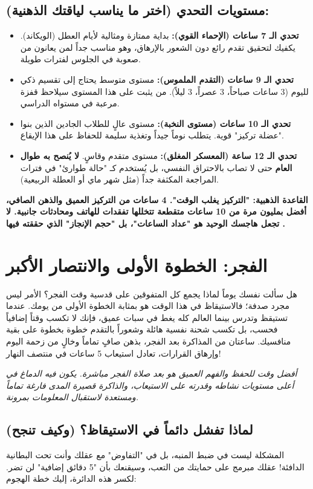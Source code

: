 \documentclass[12pt,a4paper]{book}
\newcommand{\quoteAr}[1]{%
	\begin{myquote}
		\itshape #1
	\end{myquote}
}
\newcommand{\importantAr}[1]{%
	\begin{important}
		\bfseries #1
	\end{important}
}
\begin{document}
	\subsection*{مستويات التحدي (اختر ما يناسب لياقتك الذهنية):}
	\begin{itemize}
		\item \textbf{تحدي الـ 7 ساعات (الإحماء القوي):} بداية ممتازة ومثالية لأيام العطل (الويكاند). يكفيك لتحقيق تقدم رائع دون الشعور بالإرهاق، وهو مناسب جداً لمن يعانون من صعوبة في الجلوس لفترات طويلة.
		\item \textbf{تحدي الـ 9 ساعات (التقدم الملموس):} مستوى متوسط يحتاج إلى تقسيم ذكي لليوم (3 ساعات صباحاً، 3 عصراً، 3 ليلاً). من يثبت على هذا المستوى سيلاحظ قفزة مرعبة في مستواه الدراسي.
		\item \textbf{تحدي الـ 10 ساعات (مستوى النخبة):} مستوى عالٍ للطلاب الجادين الذين بنوا "عضلة تركيز" قوية. يتطلب نوماً جيداً وتغذية سليمة للحفاظ على هذا الإيقاع.
		\item \textbf{تحدي الـ 12 ساعة (المعسكر المغلق):} مستوى متقدم وقاسٍ. \textbf{لا يُنصح به طوال العام} حتى لا تصاب بالاحتراق النفسي، بل يُستخدم كـ "حالة طوارئ" في فترات المراجعة المكثفة جداً (مثل شهر ماي أو العطلة الربيعية).
	\end{itemize}
	
	\importantAr{القاعدة الذهبية: "التركيز يغلب الوقت". 4 ساعات من التركيز العميق والذهن الصافي، أفضل بمليون مرة من 10 ساعات متقطعة تتخللها تفقدات للهاتف ومحادثات جانبية. لا تجعل هاجسك الوحيد هو "عداد الساعات"، بل "حجم الإنجاز" الذي حققته فيها  .}
	
	\section{ الفجر: الخطوة الأولى والانتصار الأكبر}
	
	هل سألت نفسك يوماً لماذا يجمع كل المتفوقين على قدسية وقت الفجر؟ الأمر ليس مجرد صدفة؛ فالاستيقاظ في هذا الوقت هو بمثابة الخطوة الأولى من يومك. عندما تستيقظ وتدرس بينما العالم كله يغط في سبات عميق، فإنك لا تكسب وقتاً إضافياً فحسب، بل تكسب شحنة نفسية هائلة وشعوراً بالتقدم خطوة بخطوة على بقية منافسيك. ساعتان من المذاكرة بعد الفجر، بذهن صافٍ تماماً وخالٍ من زحمة اليوم وإرهاق القرارات، تعادل استيعاب 5 ساعات في منتصف النهار!
	
	\quoteAr{أفضل وقت للحفظ والفهم العميق هو بعد صلاة الفجر مباشرة. يكون فيه الدماغ في أعلى مستويات نشاطه وقدرته على الاستيعاب، والذاكرة قصيرة المدى فارغة تماماً ومستعدة لاستقبال المعلومات بمرونة.}
	
	\subsection*{لماذا تفشل دائماً في الاستيقاظ؟ (وكيف تنجح)}
	المشكلة ليست في ضبط المنبه، بل في "التفاوض" مع عقلك وأنت تحت البطانية الدافئة! عقلك مبرمج على حمايتك من التعب، وسيقنعك بأن   \newline
	"5 دقائق إضافية" لن تضر. لكسر هذه الدائرة، إليك خطة الهجوم:
	
\end{document}
